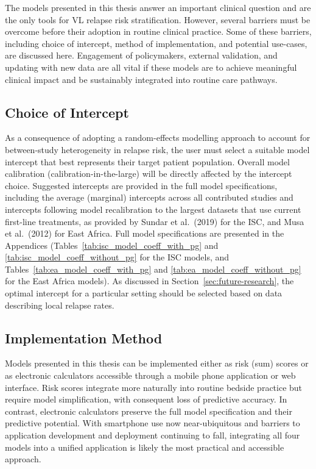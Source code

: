 
The models presented in this thesis answer an important clinical question and are the only tools for VL relapse risk stratification. However, several barriers must be overcome before their adoption in routine clinical practice. Some of these barriers, including choice of intercept, method of implementation, and potential use-cases, are discussed here. Engagement of policymakers, external validation, and updating with new data are all vital if these models are to achieve meaningful clinical impact and be sustainably integrated into routine care pathways.

\subsection{Choice of Intercept}

As a consequence of adopting a random-effects modelling approach to account for between-study heterogeneity in relapse risk, the user must select a suitable model intercept that best represents their target patient population. Overall model calibration (calibration-in-the-large) will be directly affected by the intercept choice. Suggested intercepts are provided in the full model specifications, including the average (marginal) intercepts across all contributed studies and intercepts following model recalibration to the largest datasets that use current first-line treatments, as provided by Sundar et al.\ (2019) for the ISC, and Musa et al.\ (2012) for East Africa\cite{sundar2019,musa2012}. Full model specifications are presented in the Appendices (Tables~\ref{tab:isc_model_coeff_with_pg} and \ref{tab:isc_model_coeff_without_pg} for the ISC models, and Tables~\ref{tab:ea_model_coeff_with_pg} and \ref{tab:ea_model_coeff_without_pg} for the East Africa models). As discussed in Section~\ref{sec:future-research}, the optimal intercept for a particular setting should be selected based on data describing local relapse rates.

\subsection{Implementation Method}

Models presented in this thesis can be implemented either as risk (sum) scores or as electronic calculators accessible through a mobile phone application or web interface\cite{collins2024A, bonnettGuidePresentingClinical2019}. Risk scores integrate more naturally into routine bedside practice but require model simplification, with consequent loss of predictive accuracy. In contrast, electronic calculators preserve the full model specification and their predictive potential. With smartphone use now near-ubiquitous and barriers to application development and deployment continuing to fall, integrating all four models into a unified application is likely the most practical and accessible approach\cite{liu2022, watson2019}.

